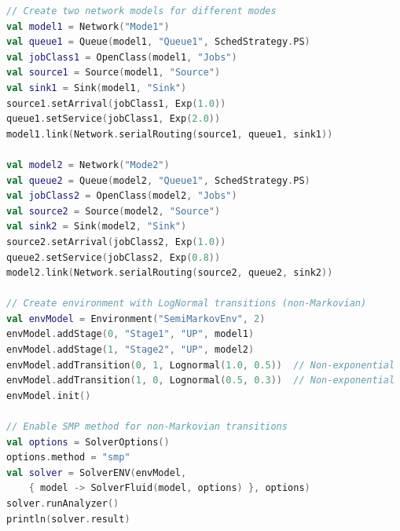 \begin{KOTLIN}
\begin{lstlisting}[language = kotlin, basicstyle=\ttfamily\scriptsize]
// Create two network models for different modes
val model1 = Network("Mode1")
val queue1 = Queue(model1, "Queue1", SchedStrategy.PS)
val jobClass1 = OpenClass(model1, "Jobs")
val source1 = Source(model1, "Source")
val sink1 = Sink(model1, "Sink")
source1.setArrival(jobClass1, Exp(1.0))
queue1.setService(jobClass1, Exp(2.0))
model1.link(Network.serialRouting(source1, queue1, sink1))

val model2 = Network("Mode2")
val queue2 = Queue(model2, "Queue1", SchedStrategy.PS)
val jobClass2 = OpenClass(model2, "Jobs")
val source2 = Source(model2, "Source")
val sink2 = Sink(model2, "Sink")
source2.setArrival(jobClass2, Exp(1.0))
queue2.setService(jobClass2, Exp(0.8))
model2.link(Network.serialRouting(source2, queue2, sink2))

// Create environment with LogNormal transitions (non-Markovian)
val envModel = Environment("SemiMarkovEnv", 2)
envModel.addStage(0, "Stage1", "UP", model1)
envModel.addStage(1, "Stage2", "UP", model2)
envModel.addTransition(0, 1, Lognormal(1.0, 0.5))  // Non-exponential
envModel.addTransition(1, 0, Lognormal(0.5, 0.3))  // Non-exponential
envModel.init()

// Enable SMP method for non-Markovian transitions
val options = SolverOptions()
options.method = "smp"
val solver = SolverENV(envModel,
    { model -> SolverFluid(model, options) }, options)
solver.runAnalyzer()
println(solver.result)
\end{lstlisting}
\end{KOTLIN}

